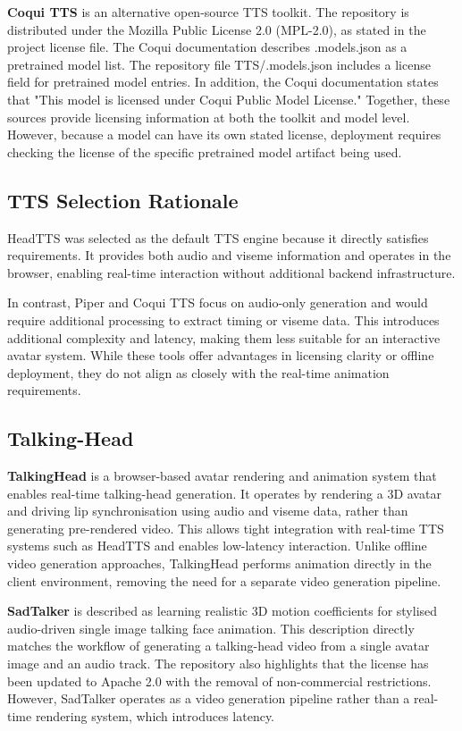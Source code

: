 \textbf{Coqui TTS} is an alternative open-source TTS toolkit. The repository is distributed under the Mozilla Public License 2.0 (MPL-2.0), as stated in the project license file. The Coqui documentation describes .models.json as a pretrained model list. The repository file TTS/.models.json includes a license field for pretrained model entries. In addition, the Coqui documentation states that "This model is licensed under Coqui Public Model License." Together, these sources provide licensing information at both the toolkit and model level. However, because a model can have its own stated license, deployment requires checking the license of the specific pretrained model artifact being used. \parencite{TTSLICEN25:online, TTSTTSmo24:online}

\subsection{TTS Selection Rationale}
HeadTTS was selected as the default TTS engine because it directly satisfies requirements. It provides both audio and viseme information and operates in the browser, enabling real-time interaction without additional backend infrastructure.

In contrast, Piper and Coqui TTS focus on audio-only generation and would require additional processing to extract timing or viseme data. This introduces additional complexity and latency, making them less suitable for an interactive avatar system. While these tools offer advantages in licensing clarity or offline deployment, they do not align as closely with the real-time animation requirements.

\subsection{Talking-Head}
\textbf{TalkingHead} is a browser-based avatar rendering and animation system that enables real-time talking-head generation. It operates by rendering a 3D avatar and driving lip synchronisation using audio and viseme data, rather than generating pre-rendered video. This allows tight integration with real-time TTS systems such as HeadTTS and enables low-latency interaction. Unlike offline video generation approaches, TalkingHead performs animation directly in the client environment, removing the need for a separate video generation pipeline. \parencite{met4citi37:online}

\textbf{SadTalker} is described as learning realistic 3D motion coefficients for stylised audio-driven single image talking face animation. This description directly matches the workflow of generating a talking-head video from a single avatar image and an audio track. The repository also highlights that the license has been updated to Apache 2.0 with the removal of non-commercial restrictions. However, SadTalker operates as a video generation pipeline rather than a real-time rendering system, which introduces latency. \parencite{GitHubOp96:online}

